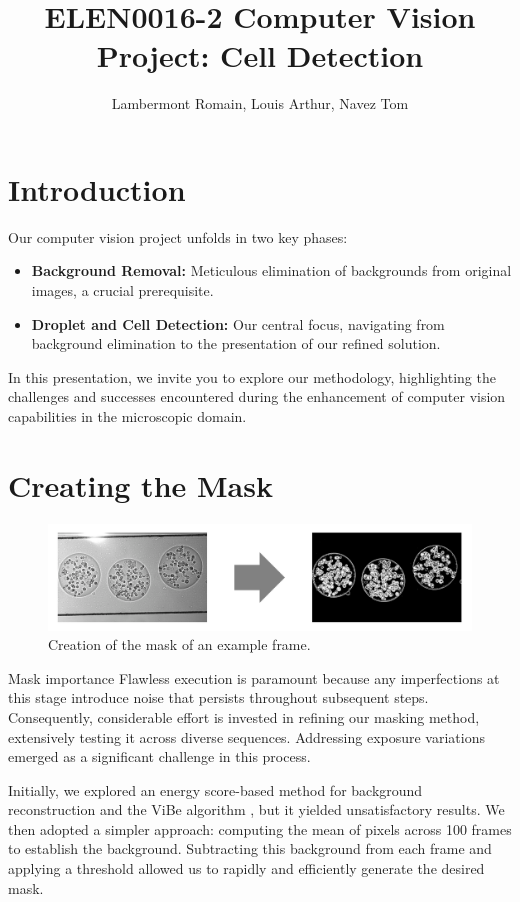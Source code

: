 \documentclass[12pt]{beamer}
\title{ELEN0016-2 Computer Vision Project: Cell Detection}
\author{Lambermont Romain, Louis Arthur, Navez Tom}
\begin{document}
\begin{frame}[t]
\begin{multicols}{3}

\section{Introduction}
Our computer vision project unfolds in two key phases:

\begin{itemize}
  \item \textbf{Background Removal:} Meticulous elimination of backgrounds from original images, a crucial prerequisite.
  \item \textbf{Droplet and Cell Detection:} Our central focus, navigating from background elimination to the presentation of our refined solution.
\end{itemize}

In this presentation, we invite you to explore our methodology, highlighting the challenges and successes encountered during the enhancement of computer vision capabilities in the microscopic domain. 

\section{Creating the Mask}
    \begin{figure}[H]
        \centering
        \includegraphics[width=.9\linewidth]{figs/section1.png}
        \caption{Creation of the mask of an example frame.}
        \label{fig:mask}
    \end{figure}

\begin{block}{Mask importance}
 Flawless execution is paramount because any imperfections at this stage introduce noise that persists throughout subsequent steps. Consequently, considerable effort is invested in refining our masking method, extensively testing it across diverse sequences. Addressing exposure variations emerged as a significant challenge in this process.
\end{block}
Initially, we explored an energy score-based method for background reconstruction and the ViBe algorithm \cite{Vibe}, but it yielded unsatisfactory results. We then adopted a simpler approach: computing the mean of pixels across 100 frames to establish the background. Subtracting this background from each frame and applying a threshold allowed us to rapidly and efficiently generate the desired mask.


\end{multicols}
\end{frame}
\end{document}
